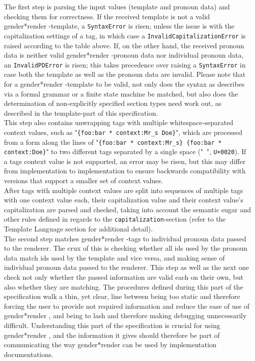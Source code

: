 \documentclass{article}
\newcommand{\GenderRender}{
    gender*render
}
\begin{document}
    The first step is parsing the input values (template and pronoun data) and checking them for correctness.
    If the received template is not a valid \GenderRender-template, a \texttt{SyntaxError} is risen;
    unless the issue is with the capitalization settings of a tag, in which case a \texttt{InvalidCapitalizationError} is raised according to the table above.
    If, on the other hand, the received pronoun data is neither valid \GenderRender-pronoun data nor individual pronoun data, an \texttt{InvalidPDError} is risen;
    this takes precedence over raising a \texttt{SyntaxError} in case both the template as well as the pronoun data are invalid.
    Please note that for a \GenderRender-template to be valid, not only does the syntax as describes via a formal grammar or a finite state machine be matched, but also does the determination of non-explicitly specified section types need work out, as described in the template-part of this specification.\\


    This step also contains unwrapping tags with multiple whitespace-separated context values, such as "\texttt{\{foo:bar * context:Mr\_s Doe\}}", which are processed from a form along the lines of "\texttt{\{foo:bar * context:Mr\_s\} \{foo:bar * context:Doe\}}" to two different tags separated by a single space ("\texttt{ }", \texttt{U+0020}).
    If a tags context value is not supported, an error may be risen, but this may differ from implementation to implementation to ensure backwards compatibility with versions that support a smaller set of context values.\\

    After tags with multiple context values are split into sequences of multiple tags with one context value each, their capitalization value and their context value's capitalization are parsed and checked, taking into account the semantic sugar and other rules defined in regards to the \texttt{capitalization}-section (refer to the Template Language section for additional detail).\\

    The second step matches \GenderRender-tags to individual pronoun data passed to the renderer.
    The crux of this is checking whether all ids used by the pronoun data match ids used by the template and vice versa, and making sense of individual pronoun data passed to the renderer.
    This step as well as the next one check not only whether the passed information are valid each on their own, but also whether they are matching.
    The procedures defined during this part of the specification walk a thin, yet clear, line between being too static and therefore forcing the user to provide not required information and reduce the ease of use of \GenderRender, and being to lash and therefore making debugging unnecessarily difficult.
    Understanding this part of the specification is crucial for using \GenderRender, and the information it gives should therefore be part of communicating the way \GenderRender can be used by implementation documentations.\\
\end{document}
